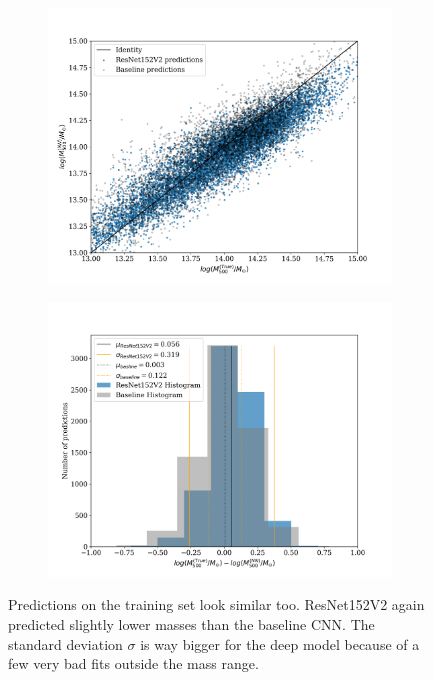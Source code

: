 \begin{figure}[H]
\begin{subfigure}{.5\textwidth}
    \centering
    \includegraphics[width=\linewidth]{images/Chapter4/Results/training_ResNet152V2_scatter.png}
    \label{fig:training_ResNet152V2_scatter}
\end{subfigure}
\begin{subfigure}{.5\textwidth}
    \centering
    \includegraphics[width=\linewidth]{images/Chapter4/Results/training_ResNet152V2_hist.png}
    \label{fig:training_ResNet152V2_hist}
\end{subfigure}
\label{fig:res52v2_all_training}
\caption{Predictions on the training set look similar too. ResNet152V2 again predicted slightly lower masses than the baseline CNN. The standard deviation $\sigma$ is way bigger for the deep model because of a few very bad fits outside the mass range.}
\end{figure}

